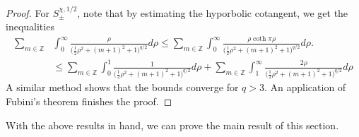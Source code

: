 \documentclass{amsart}
\theoremstyle{definition}
\theoremstyle{remark}
\numberwithin{equation}{section}
\begin{document}
\begin{proof}
    For $S^{\chi,1/2}_\pm$, note that by estimating the hyporbolic cotangent, we get the inequalities
    \begin{align*}
        \sum_{m\in\mathbb{Z}}&\int_0^\infty \frac{\rho}{\Big(\tfrac{1}{2}\rho^2+(m+1)^2+1\Big)^{q/2}}d\rho\leq\sum_{m\in\mathbb{Z}}\int_0^\infty \frac{\rho\coth\pi\rho}{\Big(\tfrac{1}{2}\rho^2+(m+1)^2+1\Big)^{q/2}}d\rho.\\
        &\leq\sum_{m\in\mathbb{Z}}\int_0^1 \frac{1}{\Big(\tfrac{1}{2}\rho^2+(m+1)^2+1\Big)^{q/2}}d\rho+\sum_{m\in\mathbb{Z}}\int_1^\infty \frac{2\rho}{\Big(\tfrac{1}{2}\rho^2+(m+1)^2+1\Big)^{q/2}}d\rho
    \end{align*}
    A similar method shows that the bounds converge for $q>3$. An application of Fubini's theorem finishes the proof.
\end{proof}

With the above results in hand, we can prove the main result of this section.
\end{document}
